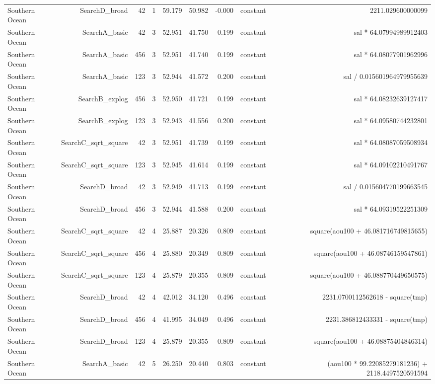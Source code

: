 \begin{table}
{\begin{tabular}{lrrrrrrrr}
Southern Ocean & SearchD\_broad & 42 & 1 & 59.179 & 50.982 & -0.000 & constant & 2211.029600000099 \\
Southern Ocean & SearchA\_basic & 42 & 3 & 52.951 & 41.750 & 0.199 & constant & sal * 64.07994989912403 \\
Southern Ocean & SearchA\_basic & 456 & 3 & 52.951 & 41.740 & 0.199 & constant & sal * 64.08077901962996 \\
Southern Ocean & SearchA\_basic & 123 & 3 & 52.944 & 41.572 & 0.200 & constant & sal / 0.015601964979955639 \\
Southern Ocean & SearchB\_explog & 456 & 3 & 52.950 & 41.721 & 0.199 & constant & sal * 64.08232639127417 \\
Southern Ocean & SearchB\_explog & 123 & 3 & 52.943 & 41.556 & 0.200 & constant & sal * 64.09580744232801 \\
Southern Ocean & SearchC\_sqrt\_square & 42 & 3 & 52.951 & 41.739 & 0.199 & constant & sal * 64.08087059508934 \\
Southern Ocean & SearchC\_sqrt\_square & 123 & 3 & 52.945 & 41.614 & 0.199 & constant & sal * 64.09102210491767 \\
Southern Ocean & SearchD\_broad & 42 & 3 & 52.949 & 41.713 & 0.199 & constant & sal / 0.015604770199663545 \\
Southern Ocean & SearchD\_broad & 456 & 3 & 52.944 & 41.588 & 0.200 & constant & sal * 64.09319522251309 \\
Southern Ocean & SearchC\_sqrt\_square & 42 & 4 & 25.887 & 20.326 & 0.809 & constant & square(aou100 + 46.081716749815655) \\
Southern Ocean & SearchC\_sqrt\_square & 456 & 4 & 25.880 & 20.349 & 0.809 & constant & square(aou100 + 46.08746159547861) \\
Southern Ocean & SearchC\_sqrt\_square & 123 & 4 & 25.879 & 20.355 & 0.809 & constant & square(aou100 + 46.088770449650575) \\
Southern Ocean & SearchD\_broad & 42 & 4 & 42.012 & 34.120 & 0.496 & constant & 2231.0700112562618 - square(tmp) \\
Southern Ocean & SearchD\_broad & 456 & 4 & 41.995 & 34.049 & 0.496 & constant & 2231.386812433331 - square(tmp) \\
Southern Ocean & SearchD\_broad & 123 & 4 & 25.879 & 20.355 & 0.809 & constant & square(aou100 + 46.08875404846314) \\
Southern Ocean & SearchA\_basic & 42 & 5 & 26.250 & 20.440 & 0.803 & constant & (aou100 * 99.22085279181236) + 2118.4497520591594 \\

\end{tabular}}
\end{table}
